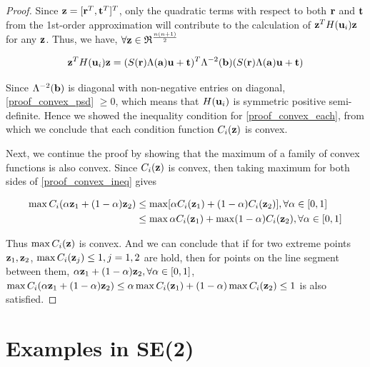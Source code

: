 \documentclass{article}
\begin{document}
\begin{proof}
	Since ${\bf z} = [{\bf r}^T, {\bf t}^T]^T$, only the quadratic terms with respect to both ${\bf r}$ and ${\bf t}$ from the 1st-order approximation will contribute to the calculation of ${\bf z}^T H({\bf u}_i) {\bf z}$ for any ${\bf z}$. Thus, we have, $\forall {\bf z} \in \mathfrak{R}^{\frac{n(n+1)}{2}}$
	
	\begin{equation}
	\label{proof_convex_psd}
	{\bf z}^T H({\bf u}_i) {\bf z} = (S({\bf r}) \Lambda({\bf a}) {\bf u} + {\bf t})^T \Lambda^{-2}({\bf b}) (S({\bf r}) \Lambda({\bf a}) {\bf u} + {\bf t})
	\end{equation}
	
	Since $\Lambda^{-2}({\bf b})$ is diagonal with non-negative entries on diagonal, \eqref{proof_convex_psd} $\geq 0$, which means that $H({\bf u}_i)$ is symmetric positive semi-definite. Hence we showed the inequality condition for \eqref{proof_convex_each}, from which we conclude that each condition function $C_i({\bf z})$ is convex.
	
	Next, we continue the proof by showing that the maximum of a family of convex functions is also convex. Since $C_i({\bf z})$ is convex, then taking maximum for both sides of \eqref{proof_convex_ineq} gives
	
	\begin{equation}
	\begin{aligned}
	\max C_i(\alpha {\bf z}_1 + (1-\alpha) {\bf z}_2) &\leq \max [\alpha C_i({\bf z}_1) + (1-\alpha) C_i({\bf z}_2)],  \forall  \alpha \in [0,1]\\
	&\leq \max \alpha C_i({\bf z}_1) + \max (1-\alpha) C_i({\bf z}_2),  \forall  \alpha \in [0,1] \\
	\end{aligned}
	\end{equation}
	
	Thus $\max C_i({\bf z})$ is convex. And we can conclude that if for two extreme points ${\bf z}_1, {\bf z}_2$, $\max C_i({\bf z}_j) \leq 1, j=1,2$ are hold, then for points on the line segment between them, $\alpha {\bf z}_1 + (1-\alpha) {\bf z}_2, \forall \alpha \in [0,1]$, $\max C_i(\alpha {\bf z}_1 + (1-\alpha) {\bf z}_2) \leq \alpha \max C_i({\bf z}_1) + (1-\alpha) \max C_i({\bf z}_2) \leq 1$ is also satisfied. 
\end{proof}

\section{Examples in SE(2)}
\end{document}
